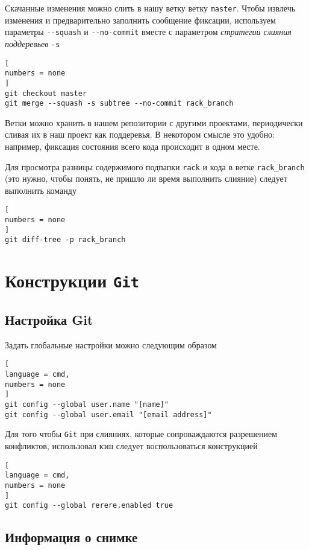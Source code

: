 \documentclass[%
	11pt,
	a4paper,
	utf8,
		]{article}
\begin{document}
Скачанные изменения можно слить в нашу ветку ветку \texttt{master}. Чтобы извлечь изменения и предварительно заполнить сообщение фиксации, используем параметры \verb|--squash| и \verb|--no-commit| вместе с параметром \emph{стратегии слияния поддеревьев} \texttt{-s}
\begin{lstlisting}[
numbers = none
]
git checkout master
git merge --squash -s subtree --no-commit rack_branch
\end{lstlisting}

Ветки можно хранить в нашем репозитории с другими проектами, периодически сливая их в наш проект как поддеревья. В некотором смысле это удобно: например, фиксация состояния всего кода происходит в одном месте.

Для просмотра разницы содержимого подпапки \texttt{rack} и кода в ветке \texttt{rack\_branch} (это нужно, чтобы понять, не пришло ли время выполнить слияние) следует выполнить команду
\begin{lstlisting}[
numbers = none
]
git diff-tree -p rack_branch
\end{lstlisting}


\section{Конструкции \texttt{Git}}

\subsection{Настройка Git}

Задать глобальные настройки можно следующим образом

\begin{lstlisting}[
language = cmd,
numbers = none
]
git config --global user.name "[name]"
git config --global user.email "[email address]"
\end{lstlisting}

Для того чтобы \texttt{Git} при слияниях, которые сопроваждаются разрешением конфликтов, использовал кэш следует воспользоваться конструкцией

\begin{lstlisting}[
language = cmd,
numbers = none
]
git config --global rerere.enabled true
\end{lstlisting}

\subsection{Информация о снимке}
\end{document}
